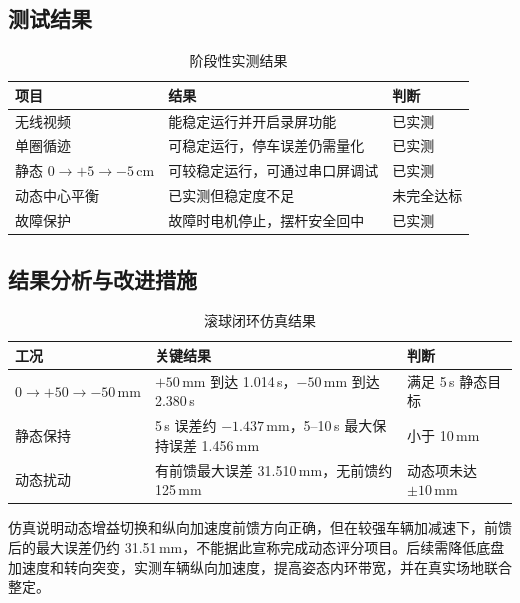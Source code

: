 \documentclass[UTF8,a4paper,12pt]{ctexart}
\begin{document}
\subsection{测试结果}

\begin{table}[H]
  \centering
  \caption{阶段性实测结果}
  \label{tab:test-results}
  \begin{tabularx}{\textwidth}{>{\raggedright\arraybackslash}p{}X>{\raggedright\arraybackslash}p{}}
    \toprule
    项目 & 结果 & 判断 \\
    \midrule
    无线视频 & 能稳定运行并开启录屏功能 & 已实测 \\
    单圈循迹 & 可稳定运行，停车误差仍需量化 & 已实测 \\
    静态 $0\rightarrow+5\rightarrow-5\,\mathrm{cm}$ & 可较稳定运行，可通过串口屏调试 & 已实测 \\
    动态中心平衡 & 已实测但稳定度不足 & 未完全达标 \\
    故障保护 & 故障时电机停止，摆杆安全回中 & 已实测 \\
    \bottomrule
  \end{tabularx}
\end{table}

\subsection{结果分析与改进措施}

\begin{table}[H]
  \centering
  \caption{滚球闭环仿真结果}
  \label{tab:simulation-results}
  \begin{tabularx}{\textwidth}{>{\raggedright\arraybackslash}p{}X>{\raggedright\arraybackslash}p{}}
    \toprule
    工况 & 关键结果 & 判断 \\
    \midrule
    $0\rightarrow+50\rightarrow-50\,\mathrm{mm}$ & $+50\,\mathrm{mm}$ 到达 1.014\,s，$-50\,\mathrm{mm}$ 到达 2.380\,s & 满足 5\,s 静态目标 \\
    静态保持 & 5\,s 误差约 $-1.437\,\mathrm{mm}$，5--10\,s 最大保持误差 1.456\,mm & 小于 10\,mm \\
    动态扰动 & 有前馈最大误差 31.510\,mm，无前馈约 125\,mm & 动态项未达 $\pm10\,\mathrm{mm}$ \\
    \bottomrule
  \end{tabularx}
\end{table}

仿真说明动态增益切换和纵向加速度前馈方向正确，但在较强车辆加减速下，前馈后的最大误差仍约 31.51\,mm，不能据此宣称完成动态评分项目。后续需降低底盘加速度和转向突变，实测车辆纵向加速度，提高姿态内环带宽，并在真实场地联合整定。
\end{document}
